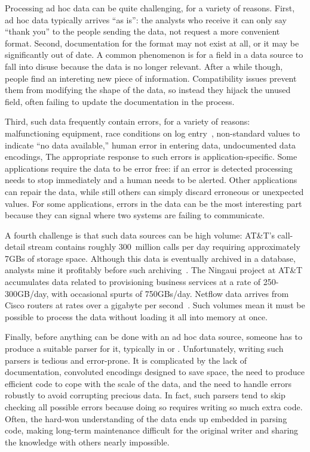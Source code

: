 \documentclass{sig-alternate}
\begin{document}
Processing ad hoc data can be quite challenging, for a variety of
reasons. First, ad hoc data typically arrives ``as is'': the analysts
who receive it can only say ``thank you'' to the people sending the
data, not request a more convenient format. 
Second, documentation for the format may not exist at all, or it may be
significantly out of date.  A common phenomenon is for a field in a
data source to fall into disuse because the data is no longer
relevant.  After a while though, people find an intereting new piece of
information.  Compatibility issues prevent them from modifying the
shape of the data, so instead they hijack the unused field, often
failing to update the documentation in the process.

Third, such data frequently contain errors, for a variety of
reasons: malfunctioning equipment, race conditions on log
entry~\cite{wpp}, non-standard values to indicate ``no data
available,'' human error in entering data, undocumented data
encodings, \etc{} The appropriate response to such errors is
application-specific. Some applications require the data to be error free: 
if an error is detected processing needs to stop immediately and a human
needs to be alerted.  Other applications can repair the data, while still
others can simply discard erroneous or unexpected values.  
For some applications,
errors in the data can be the most interesting part  because
they can signal where two systems are failing to communicate.

A fourth challenge is that such data sources can be high volume:
AT\&T's call-detail stream contains roughly 300~million calls per day
requiring approximately 7GBs of storage space. Although this data is
eventually archived in a database, analysts mine it profitably before
such archiving~\cite{kdd98,kdd99}. The Ningaui project at AT\&T
accumulates data related to provisioning business services at a rate
of 250-300GB/day, with occasional spurts of 750GBs/day.  Netflow data
arrives from Cisco routers at rates over a gigabyte per
second~\cite{gigascope}. Such volumes mean it must be possible to
process the data without loading it all into memory at once.

Finally, before anything can be done with an ad hoc data source,
someone has to produce a suitable parser for it, typically in \C{} or \perl{}. 
Unfortunately, writing
such parsers is tedious and error-prone. It is complicated by the lack
of documentation, convoluted encodings designed to save space, 
the need to produce efficient code to cope with the scale of the data,
and the need to handle errors robustly to avoid corrupting precious data.
In fact, such parsers tend to skip checking all possible errors
because doing so requires writing so much extra code. 
Often, the hard-won understanding of the data
ends up embedded in parsing code, making long-term maintenance
difficult for the original writer and sharing the knowledge with
others nearly impossible.
\end{document}
